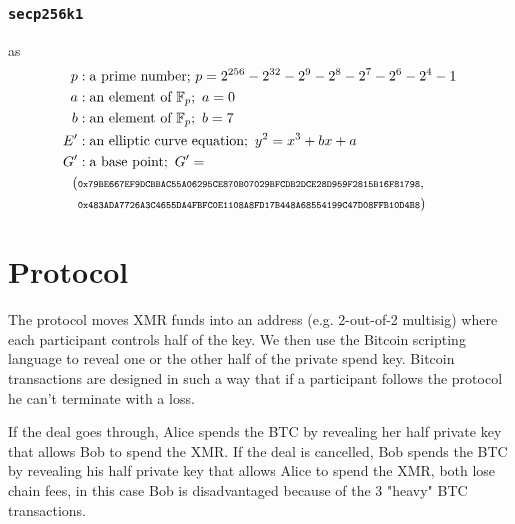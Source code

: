\documentclass{llncs}
\begin{document}
\subsubsection{\texttt{secp256k1}} as
\begin{equation}
\begin{split}
    p&: \text{a prime number;}\ p = 2^{256} - 2^{32} - 2^9 - 2^8 - 2^7 - 2^6 - 2^4 - 1 \\
    a&: \text{an element of } \mathbb{F}_p;\ a = 0 \\
    b&: \text{an element of } \mathbb{F}_p;\ b = 7 \\
    E'&: \text{an elliptic curve equation};\ y^2 = x^3 + bx + a \\
    G'&: \text{a base point};\ G' = \\ (&\scriptsize\texttt{0x79BE667EF9DCBBAC55A06295CE870B07029BFCDB2DCE28D959F2815B16F81798},\\ &\scriptsize\texttt{0x483ADA7726A3C4655DA4FBFC0E1108A8FD17B448A68554199C47D08FFB10D4B8}) \\
\end{split}
\end{equation}

\section{Protocol}
The protocol moves XMR funds into an address (e.g. 2-out-of-2 multisig) where each participant controls half of the key. We then use the Bitcoin scripting language to reveal one or the other half of the private spend key. Bitcoin transactions are designed in such a way that if a participant follows the protocol he can't terminate with a loss.

If the deal goes through, Alice spends the BTC by revealing her half private key that allows Bob to spend the XMR. If the deal is cancelled, Bob spends the BTC by revealing his half private key that allows Alice to spend the XMR, both lose chain fees, in this case Bob is disadvantaged because of the 3 "heavy" BTC transactions.
\end{document}
